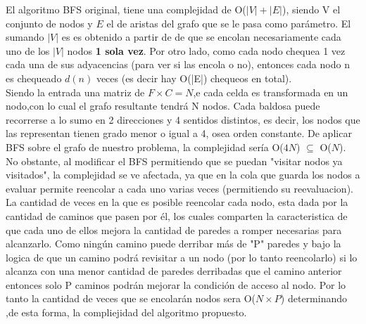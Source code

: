  El algoritmo BFS original, tiene una complejidad de O($|V|+|E|$), siendo V el conjunto de nodos y $E$ el de aristas del grafo que se le pasa como parámetro. El sumando $|V|$ es es obtenido a partir de de que se encolan necesariamente cada uno de los $|V|$ nodos {\bf 1 sola vez}. Por otro lado, como cada nodo chequea 1 vez cada una de sus adyacencias (para ver si las encola o no), entonces cada nodo n es chequeado $d(n)$ veces (es decir hay O(|E|) chequeos en total). \\

Siendo la entrada una matriz de $F \times C = N$,e cada celda es transformada en un nodo,con lo cual el grafo resultante tendrá N nodos. Cada baldosa puede recorrerse a lo sumo en 2 direcciones y 4 sentidos distintos, es decir, los nodos que las representan tienen grado menor o igual a 4, osea orden constante. De aplicar BFS sobre el grafo de nuestro problema, la complejidad sería O($4N$) $\subseteq$ O($N$).
No obstante, al modificar el BFS permitiendo que se puedan "visitar nodos ya visitados", la complejidad se ve afectada, ya que en la cola que guarda los nodos a evaluar permite reencolar a cada uno varias veces (permitiendo su reevaluacion).\\

La cantidad de veces en la que es posible reencolar cada nodo, esta dada por la cantidad de caminos que pasen por él, los cuales comparten la caracteristica de que cada uno de ellos mejora la cantidad de paredes a romper necesarias para alcanzarlo. Como ningún camino puede derribar más de "P" paredes y bajo la logica de que un camino podrá revisitar a un nodo (por lo tanto reencolarlo) si lo alcanza con una menor cantidad de paredes derribadas que el camino anterior entonces solo P caminos podrán mejorar la condición de acceso al nodo. Por lo tanto la cantidad de veces que se encolarán nodos sera O($N \times P$) determinando ,de esta forma, la compliejidad del algoritmo propuesto.






